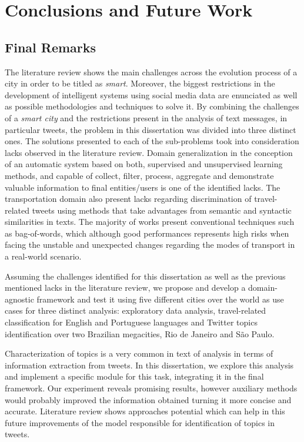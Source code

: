 \chapter{Conclusions and Future Work} \label{chap:conclusions}

\minitoc \mtcskip \noindent

\section{Final Remarks}
The literature review shows the main challenges across the evolution process of a city in order to be titled as \textit{smart}. Moreover, the biggest restrictions in the development of intelligent systems using social media data are enunciated as well as possible methodologies and techniques to solve it. By combining the challenges of a \textit{smart city} and the restrictions present in the analysis of text messages, in particular tweets, the problem in this dissertation was divided into three distinct ones. The solutions presented to each of the sub-problems took into consideration lacks observed in the literature review. Domain generalization in the conception of an automatic system based on both, supervised and unsupervised learning methods, and capable of collect, filter, process, aggregate and demonstrate valuable information to final entities/users is one of the identified lacks. The transportation domain also present lacks regarding discrimination of travel-related tweets using methods that take advantages from semantic and syntactic similarities in texts. The majority of works present conventional techniques such as bag-of-words, which although good performances represents high risks when facing the unstable and unexpected changes regarding the modes of transport in a real-world scenario.

Assuming the challenges identified for this dissertation as well as the previous mentioned lacks in the literature review, we propose and develop a domain-agnostic framework and test it using five different cities over the world as use cases for three distinct analysis: exploratory data analysis, travel-related classification for English and Portuguese languages and Twitter topics identification over two Brazilian megacities, Rio de Janeiro and São Paulo.

Characterization of topics is a very common in text of analysis in terms of information extraction from tweets. In this dissertation, we explore this analysis and implement a specific module for this task, integrating it in the final framework. Our experiment reveals promising results, however auxiliary methods would probably improved the information obtained turning it more concise and accurate. Literature review shows approaches potential which can help in this future improvements of the model responsible for identification of topics in tweets.

